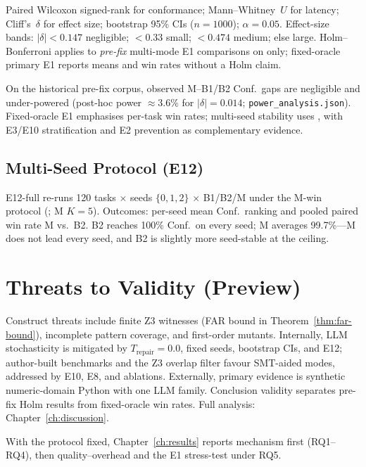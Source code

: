 Paired Wilcoxon signed-rank for conformance; Mann--Whitney~$U$ for latency;
Cliff's~$\delta$ for effect size; bootstrap 95\% CIs ($n{=}1000$);
$\alpha{=}0.05$.
Effect-size bands: $|\delta|{<}0.147$ negligible; ${<}0.33$ small;
${<}0.474$ medium; else large.
Holm--Bonferroni applies to \emph{pre-fix} multi-mode E1 comparisons on
 only; fixed-oracle primary E1 reports means and
win rates without a Holm claim.

On the historical pre-fix corpus, observed M--B1/B2 Conf.\ gaps are
negligible and under-powered (post-hoc power ${\approx}3.6\%$ for
$|\delta|{=}0.014$; \texttt{power\_analysis.json}).
Fixed-oracle E1 emphasises per-task win rates; multi-seed
stability uses , with E3/E10 stratification and E2
prevention as complementary evidence.

\subsection{Multi-Seed Protocol (E12)}
\label{sec:exp:e12}

E12-full re-runs 120 tasks ${\times}$ seeds $\{0,1,2\}$ ${\times}$ B1/B2/M under
the M-win protocol (; M $K{=}5$).
Outcomes: per-seed mean Conf.\ ranking and pooled paired win rate M vs.\ B2.
B2 reaches 100\% Conf.\ on every seed; M averages 99.7\%---M does not lead
every seed, and B2 is slightly more seed-stable at the ceiling.

\section{Threats to Validity (Preview)}
\label{sec:exp:threats-preview}

Construct threats include finite Z3 witnesses (FAR bound in
Theorem~\ref{thm:far-bound}), incomplete pattern coverage, and first-order
mutants.
Internally, LLM stochasticity is mitigated by $T_\text{repair}{=}0.0$, fixed
seeds, bootstrap CIs, and E12; author-built benchmarks and the Z3 overlap
filter favour SMT-aided modes, addressed by E10, E8, and ablations.
Externally, primary evidence is synthetic numeric-domain Python with one LLM
family.
Conclusion validity separates pre-fix Holm results from fixed-oracle win
rates.
Full analysis: Chapter~\ref{ch:discussion}.

With the protocol fixed, Chapter~\ref{ch:results} reports mechanism first
(RQ1--RQ4), then quality--overhead and the E1 stress-test under RQ5.

